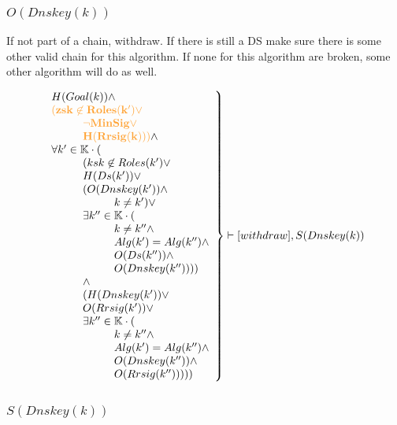 \documentclass[twoside,english, a4paper]{article}
\newcommand{\highlightMinSig}[1]{\textcolor{MinSig}{\bf{#1}}}
\newcommand{\mathbox}[1]{#1}
\begin{document}
\subsubsection{$O(Dnskey(k))$}

\mathbox{

	If not part of a chain, withdraw. If there is still a DS make sure 
	there is some other valid chain for this algorithm. If none for 
	this algorithm are broken, some other algorithm will do as well.
	
	\begin{equation}
		\left.
		\begin{array}{l}
			H(Goal(k)) \wedge \\
\highlightMinSig{\hskip 0cm	(zsk \not \in Roles(k') \vee }\\
\highlightMinSig{\hskip 1cm		\neg MinSig \vee }\\
\highlightMinSig{\hskip 1cm		H(Rrsig(k)))} \wedge \\

\hskip 0cm	\forall k' \in \mathbb{K} \cdot (\\
\hskip 1cm		(ksk \not \in Roles(k') \vee\\
\hskip 1cm		H(Ds(k')) \vee \\
\hskip 1cm		(O(Dnskey(k')) \wedge \\
\hskip 2cm			k \neq k') \vee \\
\hskip 1cm		\exists k'' \in \mathbb{K} \cdot (\\
\hskip 2cm			k \neq k'' \wedge \\
\hskip 2cm			Alg(k')=Alg(k'') \wedge \\
\hskip 2cm			O(Ds(k'')) \wedge \\
\hskip 2cm			O(Dnskey(k'')))) \\
\hskip 1cm		\wedge \\
\hskip 1cm		(H(Dnskey(k')) \vee \\
\hskip 1cm		O(Rrsig(k'))  \vee \\
\hskip 1cm		\exists k'' \in \mathbb{K} \cdot (\\
\hskip 2cm			k \neq k'' \wedge \\
\hskip 2cm			Alg(k')=Alg(k'') \wedge \\
\hskip 2cm			O(Dnskey(k'')) \wedge \\
\hskip 2cm			O(Rrsig(k'')))))
		\end{array}
		\right\} \vdash [withdraw], S(Dnskey(k))
	\end{equation}
}

\subsubsection{$S(Dnskey(k))$}
\end{document}

